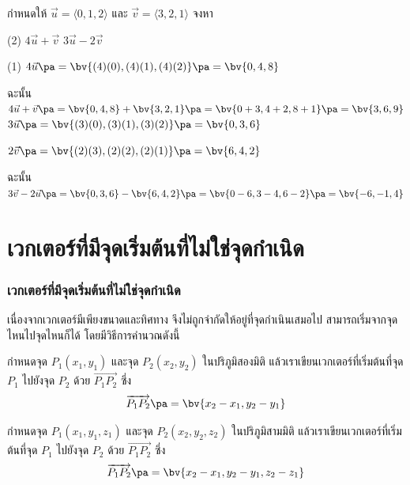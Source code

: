 \begin{frame}[t]
\begin{ex}{}
กำหนดให้ $\vec{u} = \langle 0,1,2 \rangle$ และ $\vec{v} = \langle 3,2,1 \rangle$ จงหา
\begin{tasks}(2)
\task $4\vec{u} + \vec{v}$
\task $3\vec{u} - 2\vec{v}$
\end{tasks}
\end{ex}
\begin{sol}
\begin{tasks}(1)
\task $4\vec{u} \pa = \bv{(4)(0), (4)(1), (4)(2)} \pa = \bv{0,4,8}$  \pa

ฉะนั้น $4\vec{u} + \vec{v} \pa = \bv{0,4,8} + \bv{3,2,1} \pa = \bv{0+3, 4+2, 8+1} \pa =  \bv{3,6,9}$ \pa
\task $3\vec{u} \pa= \bv{(3)(0), (3)(1), (3)(2)} \pa = \bv{0,3,6}$ \pa

 $2\vec{v}  \pa = \bv{(2)(3), (2)(2), (2)(1)} \pa = \bv{6,4,2}$ \pa

ฉะนั้น $3\vec{v} - 2\vec{u} \pa = \bv{0,3,6} - \bv{6,4,2} \pa = \bv{0-6, 3-4, 6-2} \pa = \bv{-6,-1,4}$
\end{tasks}
\end{sol}
\end{frame}

\section[จุดเริ่มต้นอื่น]{เวกเตอร์ที่มีจุดเริ่มต้นที่ไม่ใช่จุดกำเนิด}
\frame{\sectionpage}

\begin{frame}
\frametitle{เวกเตอร์ที่มีจุดเริ่มต้นที่ไม่ใช่จุดกำเนิด}
เนื่องจากเวกเตอร์มีเพียงขนาดและทิศทาง จึงไม่ถูกจำกัดให้อยู่ที่จุดกำเนินเสมอไป สามารถเริ่มจากจุดไหนไปจุดไหนก็ได้ \pa โดยมีวิธีการคำนวณดังนี้

\begin{defn}{}{}
กำหนดจุด $P_1(x_1, y_1)$ และจุด $P_2(x_2, y_2)$ ในปริภูมิสองมิติ \pa แล้วเราเขียนเวกเตอร์ที่เริ่มต้นที่จุด $P_1$ ไปยังจุด $P_2$ ด้วย $\vec{P_1P_2}$ \pa ซึ่ง
\begin{equation}
\overrightarrow{P_1P_2} \pa = \bv{ x_2 - x_1, y_2 - y_1}
\end{equation} \pa

กำหนดจุด $P_1(x_1, y_1, z_1)$ และจุด $P_2(x_2, y_2, z_2)$ ในปริภูมิสามมิติ \pa แล้วเราเขียนเวกเตอร์ที่เริ่มต้นที่จุด $P_1$ ไปยังจุด $P_2$ ด้วย $\vec{P_1P_2}$ \pa ซึ่ง
\begin{equation}
\overrightarrow{P_1P_2} \pa = \bv{ x_2 - x_1, y_2 - y_1, z_2-z_1}
\end{equation}
\end{defn}
\end{frame}


